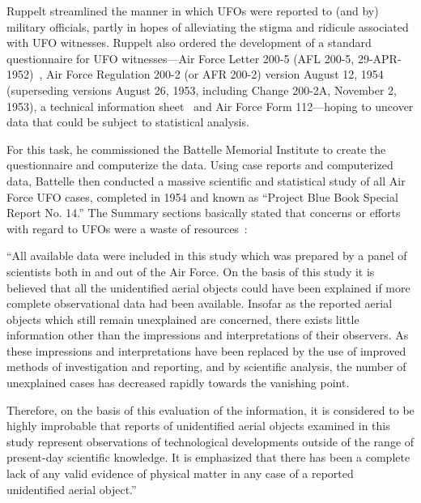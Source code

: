 Ruppelt streamlined the manner in which UFOs were reported to (and by) military officials, partly in hopes of alleviating the stigma and ridicule associated with UFO witnesses.
Ruppelt also ordered the development of a standard questionnaire for UFO witnesses---Air
Force Letter 200-5 (AFL 200-5, 29-APR-1952)~\cite{AFL200-5},
Air Force Regulation 200-2 (or AFR 200-2) version August 12, 1954~\cite{AFR200-2} (superseding versions August 26, 1953, including Change 200-2A, November 2, 1953),
a technical information sheet~\cite[Appendix~II]{PBB-SR8-1952}
and Air Force Form 112---hoping to uncover data that could be subject to statistical analysis.

For this task, he commissioned the Battelle Memorial Institute to create the questionnaire and computerize the data. Using case reports and computerized data, Battelle then conducted a massive scientific and statistical study of all Air Force UFO cases, completed in 1954 and known as ``Project Blue Book Special Report No. 14.'' The Summary sections basically stated that concerns or efforts with regard to UFOs were a waste of resources~\cite[p.~ix]{ATIC1955May-SR14}:
\begin{svgraybox}
``All available data were included in this study which was prepared by
a panel of scientists both in and out of the Air Force. On the basis of this
study it is believed that all the unidentified aerial objects could have been
explained if more complete observational data had been available. Insofar
as the reported aerial objects which still remain unexplained are concerned,
there exists little information other than the impressions and interpretations
of their observers. As these impressions and interpretations have been
replaced by the use of improved methods of investigation and reporting,
and by scientific analysis, the number of unexplained cases has decreased rapidly
towards the vanishing point.

Therefore, on the basis of this evaluation of the information, it is
considered to be highly improbable that reports of unidentified aerial objects
examined in this study represent observations of technological developments
outside of the range of present-day scientific knowledge. It is emphasized
that there has been a complete lack of any valid evidence of physical matter
in any case of a reported unidentified aerial object.''
\end{svgraybox}


